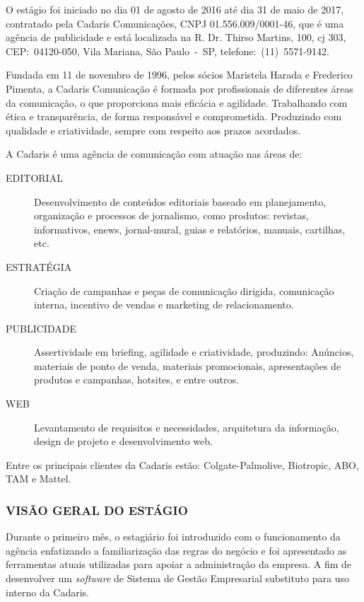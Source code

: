 \documentclass[
  12pt,				%
  openany,
  oneside,
  a4paper,			%
  english,			%
  brazil
]{article}
\numberwithin{figure}{section}
\numberwithin{table}{section}
\begin{document}
O estágio foi iniciado no dia 01 de agosto de 2016 até dia 31 de maio de 2017, contratado pela Cadaris Comunicações, CNPJ 01.556.009/0001-46, que é uma agência de publicidade e está localizada na R. Dr. Thirso Martins, 100, cj 303, CEP:~04120-050, Vila Mariana, São Paulo~-~SP, telefone:~(11)~5571-9142.

Fundada em 11 de novembro de 1996, pelos sócios Maristela Harada e Frederico Pimenta, a Cadaris Comunicação é formada por profissionais de diferentes áreas da comunicação, o que proporciona mais eficácia e agilidade. Trabalhando com ética e transparência, de forma responsável e comprometida. Produzindo com qualidade e criatividade, sempre com respeito aos prazos acordados.

A Cadaris é uma agência de comunicação com atuação nas áreas de:
\vspace{-0.5cm}

\begin{description}
	\item [EDITORIAL]   Desenvolvimento de conteúdos editoriais baseado em planejamento, organização e processos de jornalismo, como produtos: revistas, informativos, enews, jornal-mural, guias e relatórios, manuais, cartilhas, etc.
  \item [ESTRATÉGIA]  Criação de campanhas e peças de comunicação dirigida, comunicação interna, incentivo de vendas e marketing de relacionamento.
  \item [PUBLICIDADE] Assertividade em briefing, agilidade e criatividade, produzindo: Anúncios, materiais de ponto de venda, materiais promocionais, apresentações de produtos e campanhas, hotsites, e entre outros.
  \item [WEB]         Levantamento de requisitos e necessidades, arquitetura da informação, design de projeto e desenvolvimento web.
\end{description}

Entre os principais clientes da Cadaris estão: Colgate-Palmolive, Biotropic, ABO, TAM e Mattel.


\subsubsection{VISÃO GERAL DO ESTÁGIO}

Durante o primeiro mês, o estagiário foi introduzido com o funcionamento da agência enfatizando a familiarização das regras do negócio e foi apresentado as ferramentas atuais utilizadas para apoiar a administração da empresa. A fim de desenvolver um \textit{software} de Sistema de Gestão Empresarial substituto para uso interno da Cadaris. 
\end{document}
